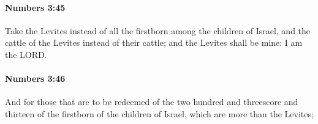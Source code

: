 		\paragraph{Numbers 3:45} %
			\label{NUMBERS-3-45}

			Take the Levites instead of all the firstborn among the children of Israel, and the cattle of the Levites instead of their cattle; and the Levites shall be mine: I am the LORD.


		\paragraph{Numbers 3:46} %
			\label{NUMBERS-3-46}

			And for those that are to be redeemed of the two hundred and threescore and thirteen of the firstborn of the children of Israel, which are more than the Levites;


